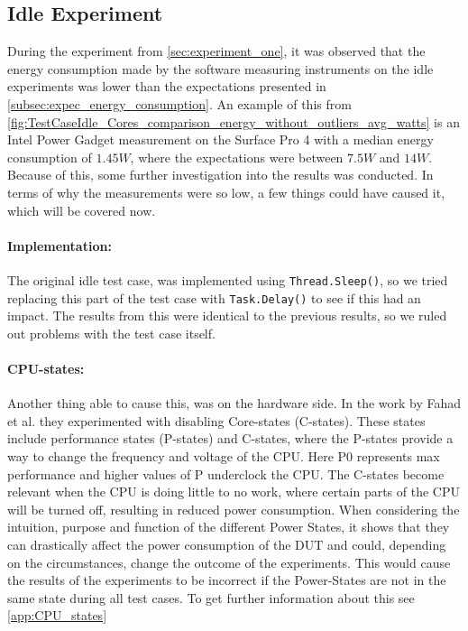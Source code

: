 \subsection{Idle Experiment}

During the experiment from \cref{sec:experiment_one}, it was observed that the energy consumption made by the software measuring instruments on the idle experiments was lower than the expectations presented in \cref{subsec:expec_energy_consumption}. An example of this from \cref{fig:TestCaseIdle_Cores_comparison_energy_without_outliers_avg_watts} is an Intel Power Gadget measurement on the Surface Pro 4 with a median energy consumption of $1.45W$, where the expectations were between $7.5W$ and $14W$. Because of this, some further investigation into the results was conducted. In terms of why the measurements were so low, a few things could have caused it, which will be covered now.



\paragraph{Implementation:} The original idle test case, was implemented using \texttt{Thread.Sleep()}, so we tried replacing this part of the test case with \texttt{Task.Delay()} to see if this had an impact. The results from this were identical to the previous results, so we ruled out problems with the test case itself.



\paragraph{CPU-states:} Another thing able to cause this, was on the hardware side. In the work by Fahad et al.\cite*[]{fahad2019comparative} they experimented with disabling Core-states (C-states). These states include performance states (P-states) and C-states\cite[]{PCStat}, where the P-states provide a way to change the frequency and voltage of the CPU. Here P0 represents max performance and higher values of P underclock the CPU. The C-states become relevant when the CPU is doing little to no work, where certain parts of the CPU will be turned off, resulting in reduced power consumption. When considering the intuition, purpose and function of the different Power States, it shows that they can drastically affect the power consumption of the DUT and could, depending on the circumstances, change the outcome of the experiments. This would cause the results of the experiments to be incorrect if the Power-States are not in the same state during all test cases. To get further information about this see \cref{app:CPU_states}


